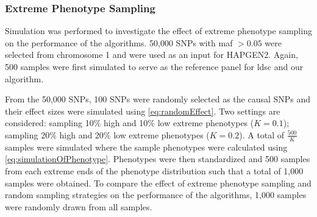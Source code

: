 		\subsubsection{Extreme Phenotype Sampling}
		Simulation was performed to investigate the effect of extreme phenotype sampling on the performance of the algorithms.
		50,000 \glspl{SNP} with \gls{maf} $>0.05$ were selected from chromosome 1 and were used as an input for HAPGEN2.
		Again, 500 samples were first simulated to serve as the reference panel for \gls{ldsc} and our algorithm.
		
		From the 50,000 \glspl{SNP}, 100 \glspl{SNP} were randomly selected as the causal \glspl{SNP} and their effect sizes were simulated using \cref{eq:randomEffect}.
		Two settings are considered: sampling 10\% high and 10\% low extreme phenotypes ($K=0.1$); sampling 20\% high and 20\% low extreme phenotypes ($K=0.2$).
		A total of $\frac{500}{K}$ samples were simulated where the sample phenotypes were calculated using \cref{eq:simulationOfPhenotype}.
		Phenotypes were then standardized and 500 samples from each extreme ends of the phenotype distribution such that a total of 1,000 samples were obtained. 
		To compare the effect of extreme phenotype sampling and random sampling strategies on the performance of the algorithms, 1,000 samples were randomly drawn from all samples.
		
